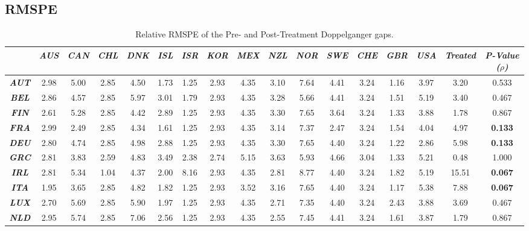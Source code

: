 \documentclass[12pt]{article}
\begin{document}
\begin{appendices}
\begin{landscape}
\subsection{RMSPE}
\begin{table}[htbp]
\scriptsize
\caption{\label{TA_RMSPE} Relative RMSPE of the Pre- and Post-Treatment Doppelganger gaps.}\centering\medskip
\begin{tabular}{cccccccccccccccc|c} \toprule
                      & \textit{\textbf{AUS}} & \textit{\textbf{CAN}} & \textit{\textbf{CHL}} & \textit{\textbf{DNK}} & \textit{\textbf{ISL}} & \textit{\textbf{ISR}}  & \textit{\textbf{KOR}} & \textit{\textbf{MEX}} & \textit{\textbf{NZL}} & \textit{\textbf{NOR}} & \textit{\textbf{SWE}} & \textit{\textbf{CHE}} & \textit{\textbf{GBR}} & \textit{\textbf{USA}} & \textit{\textbf{Treated}} & \textit{\textbf{P-Value ($\rho$)}} \\ \midrule
\textit{\textbf{AUT}} & 2.98 & 5.00 & 2.85 & 4.50 & 1.73 & 1.25 & 2.93 & 4.35 & 3.10 & 7.64 & 4.41 & 3.24 & 1.16 & 3.97 & 3.20  & 0.533  \\
\textit{\textbf{BEL}} & 2.86 & 4.57 & 2.85 & 5.97 & 3.01 & 1.79 & 2.93 & 4.35 & 3.28 & 5.66 & 4.41 & 3.24 & 1.51 & 5.19 & 3.40  & 0.467 \\
\textit{\textbf{FIN}} & 2.61 & 5.28 & 2.85 & 4.42 & 2.89 & 1.25 & 2.93 & 4.35 & 3.30 & 7.65 & 3.64 & 3.24 & 1.33 & 3.88 & 1.78  & 0.867 \\
\textit{\textbf{FRA}} & 2.99 & 2.49 & 2.85 & 4.34 & 1.61 & 1.25 & 2.93 & 4.35 & 3.14 & 7.37 & 2.47 & 3.24 & 1.54 & 4.04 & 4.97  & \textbf{0.133} \\
\textit{\textbf{DEU}} & 2.80 & 4.74 & 2.85 & 4.98 & 2.88 & 1.25 & 2.93 & 4.35 & 3.30 & 7.65 & 4.40 & 3.24 & 1.22 & 2.86 & 5.98  & \textbf{0.133} \\
\textit{\textbf{GRC}} & 2.81 & 3.83 & 2.59 & 4.83 & 3.49 & 2.38 & 2.74 & 5.15 & 3.63 & 5.93 & 4.66 & 3.04 & 1.33 & 5.21 & 0.48  & 1.000\\
\textit{\textbf{IRL}} & 2.81 & 5.34 & 1.04 & 4.37 & 2.00 & 8.16 & 2.93 & 4.35 & 2.81 & 8.77 & 4.40 & 3.24 & 1.82 & 5.19 & 15.51 & \textbf{0.067} \\
\textit{\textbf{ITA}} & 1.95 & 3.65 & 2.85 & 4.82 & 1.82 & 1.25 & 2.93 & 3.52 & 3.16 & 7.65 & 4.40 & 3.24 & 1.17 & 5.38 & 7.88  & \textbf{0.067} \\
\textit{\textbf{LUX}} & 2.70 & 5.69 & 2.85 & 5.90 & 1.97 & 1.25 & 2.93 & 4.35 & 2.71 & 7.35 & 4.40 & 3.24 & 2.43 & 3.88 & 3.69  & 0.467  \\
\textit{\textbf{NLD}} & 2.95 & 5.74 & 2.85 & 7.06 & 2.56 & 1.25 & 2.93 & 4.35 & 2.55 & 7.45 & 4.41 & 3.24 & 1.61 & 3.87 & 1.79  & 0.867  \\

\end{tabular}
\end{table}
\end{landscape}
\end{appendices}
\end{document}
